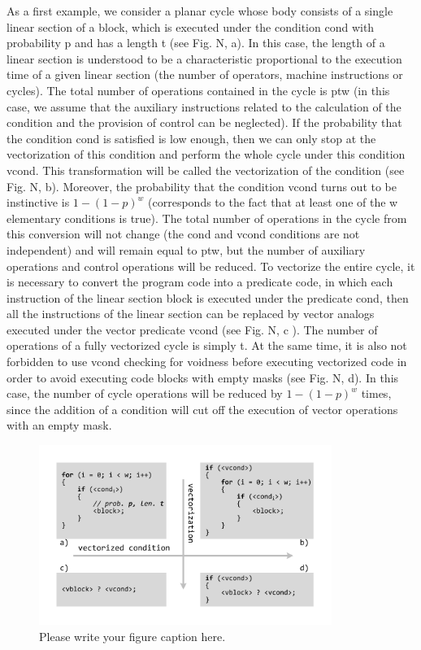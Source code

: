 \documentclass[
11pt,%
tightenlines,%
twoside,%
onecolumn,%
nofloats,%
nobibnotes,%
nofootinbib,%
superscriptaddress,%
noshowpacs,%
centertags]%
{revtex4}
\begin{document}
As a first example, we consider a planar cycle whose body consists of a single linear section of a block, which is executed under the condition cond with probability p and has a length t (see Fig. N, a). In this case, the length of a linear section is understood to be a characteristic proportional to the execution time of a given linear section (the number of operators, machine instructions or cycles). The total number of operations contained in the cycle is ptw (in this case, we assume that the auxiliary instructions related to the calculation of the condition and the provision of control can be neglected). If the probability that the condition cond is satisfied is low enough, then we can only stop at the vectorization of this condition and perform the whole cycle under this condition vcond. This transformation will be called the vectorization of the condition (see Fig. N, b). Moreover, the probability that the condition vcond turns out to be instinctive is $1 - (1 - p) ^ w$ (corresponds to the fact that at least one of the w elementary conditions is true). The total number of operations in the cycle from this conversion will not change (the cond and vcond conditions are not independent) and will remain equal to ptw, but the number of auxiliary operations and control operations will be reduced. To vectorize the entire cycle, it is necessary to convert the program code into a predicate code, in which each instruction of the linear section block is executed under the predicate cond, then all the instructions of the linear section can be replaced by vector analogs executed under the vector predicate vcond (see Fig. N, c ). The number of operations of a fully vectorized cycle is simply t. At the same time, it is also not forbidden to use vcond checking for voidness before executing vectorized code in order to avoid executing code blocks with empty masks (see Fig. N, d). In this case, the number of cycle operations will be reduced by $1 - (1 - p) ^ w$ times, since the addition of a condition will cut off the execution of vector operations with an empty mask.

\begin{figure}[h]
\setcaptionmargin{5mm}
\onelinecaptionstrue  %
\includegraphics[width=0.85\textwidth]{pics/if_vectorization.pdf}
\caption{Please write your figure caption here.}\label{fig:1}
\end{figure}
\end{document}
